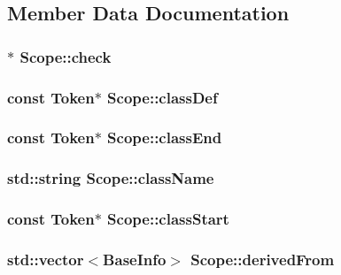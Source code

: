 \subsection{Member Data Documentation}
\hypertarget{class_scope_aebd359f14708f074b4e009897c98d448}{
\subsubsection[{check}]{$\ast$ Scope\-::check}}\label{class_scope_aebd359f14708f074b4e009897c98d448}
\hypertarget{class_scope_a98cdb9948344dd6df192d5225cac8530}{
\subsubsection[{class\-Def}]{\setlength{\rightskip}{0pt plus 5cm}const {\bf Token}$\ast$ Scope\-::class\-Def}}\label{class_scope_a98cdb9948344dd6df192d5225cac8530}
\hypertarget{class_scope_a5718de82469734086ea4910a9e97626b}{
\subsubsection[{class\-End}]{\setlength{\rightskip}{0pt plus 5cm}const {\bf Token}$\ast$ Scope\-::class\-End}}\label{class_scope_a5718de82469734086ea4910a9e97626b}
\hypertarget{class_scope_ac10ee77e8bb514bbd256e8c4e471ad48}{
\subsubsection[{class\-Name}]{\setlength{\rightskip}{0pt plus 5cm}std\-::string Scope\-::class\-Name}}\label{class_scope_ac10ee77e8bb514bbd256e8c4e471ad48}
\hypertarget{class_scope_af62c8893f9e0303a35b4416695103533}{
\subsubsection[{class\-Start}]{\setlength{\rightskip}{0pt plus 5cm}const {\bf Token}$\ast$ Scope\-::class\-Start}}\label{class_scope_af62c8893f9e0303a35b4416695103533}
\hypertarget{class_scope_a78a329cc4cc47ae0a896b8ca39aaf1d0}{
\subsubsection[{derived\-From}]{\setlength{\rightskip}{0pt plus 5cm}std\-::vector$<${\bf Base\-Info}$>$ Scope\-::derived\-From}}\label{class_scope_a78a329cc4cc47ae0a896b8ca39aaf1d0}
